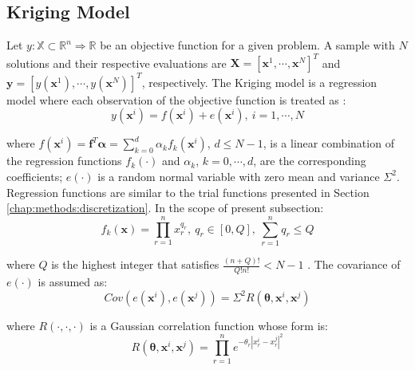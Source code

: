 		\subsection{Kriging Model}\label{chap:proposed-methodology:surrogate:kriging}
		
			Let $y : \mathbb{X} \subset \mathbb{R}^n \Rightarrow \mathbb{R}$ be an objective function for a given problem. A sample with $N$ solutions and their respective evaluations are $\mathbf{X} =  [\mathbf{x}^1, \cdots, \mathbf{x}^N]^T$ and $\mathbf{y} = [y(\mathbf{x}^1), \cdots, y(\mathbf{x}^N)]^T$, respectively. The Kriging model is a regression model where each observation of the objective function is treated as \citep{sacks1989design,schonlau1997computer,jones1998efficient}:
			\begin{equation}
				y(\mathbf{x}^i) = f(\mathbf{x}^i) + e(\mathbf{x}^i),~ i = 1, \cdots, N \label{eq:kriging:responsemodel}
			\end{equation}
		
			\noindent where $f(\mathbf{x}^i) = \mathbf{f}^T\boldsymbol{\alpha} = \sum\limits_{k=0}^d \alpha_kf_k(\mathbf{x}^i)$, $d\le N-1$, is a linear combination of the regression functions $f_k(\cdot)$ and $\alpha_k$, $k=0,\cdots,d$, are the corresponding coefficients; $e(\cdot)$ is a random normal variable with zero mean and variance $\Sigma^2$. Regression functions are similar to the trial functions presented in Section \ref{chap:methods:discretization}. In the scope of present subsection:
			\begin{equation}
				f_k(\mathbf{x}) = \prod\limits_{r=1}^n x_r^{q_r},~ q_r \in [0, Q],~ \sum\limits_{r=1}^n q_r \le Q \label{eq:kriging:trialfunctions}
			\end{equation}

			\noindent where $Q$ is the highest integer that satisfies $\frac{(n+Q)!}{Q!n!} < N-1$ \citep{zhao2011metamodeling}. The covariance of $e(\cdot)$ is assumed as:
			\begin{equation}
				Cov(e(\mathbf{x}^i), e(\mathbf{x}^j)) = \Sigma^2R(\boldsymbol{\theta},\mathbf{x}^i,\mathbf{x}^j) \label{eq:kriging:covariance}
			\end{equation}
		
			\noindent where $R(\cdot, \cdot, \cdot)$ is a Gaussian correlation function whose form is:
			\begin{equation}
				R(\boldsymbol{\theta},\mathbf{x}^i,\mathbf{x}^j) = \prod\limits_{r=1}^n e^{-\theta_r|x_r^i-x_r^j|^2} \label{eq:kriging:gaussiancorrelation}
			\end{equation}
		
